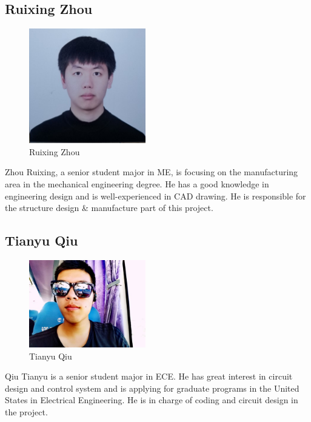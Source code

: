 \documentclass[12pt]{article}
\begin{document}
{\subsection{Ruixing Zhou}
\begin{figure}[H]
    \centering
    \includegraphics[width=2in]{z.jpg}
    \caption{Ruixing Zhou}
    \label{fig::zhou}
\end{figure}
Zhou Ruixing, a senior student major in ME, is focusing on the manufacturing area in the mechanical engineering degree. He has a good knowledge in engineering design and is well-experienced in CAD drawing. He is responsible for the structure design \& manufacture part of this project.
\subsection{Tianyu Qiu}
\begin{figure}[H]
    \centering
    \includegraphics[width=2in]{q.jpg}
    \caption{Tianyu Qiu}
    \label{fig::qiu}
\end{figure}
Qiu Tianyu is a senior student major in ECE. He has great interest in circuit design and control system and is applying for graduate programs in the United States in Electrical Engineering. He is in charge of coding and circuit design in the project.}
\end{document}
